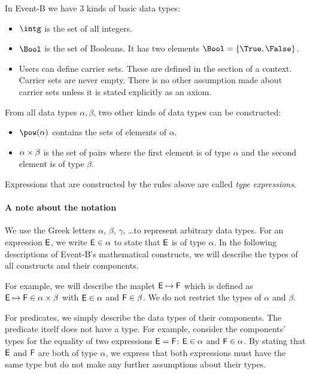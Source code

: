 In Event-B we have 3 kinds of basic data types:
\begin{itemize}
\item {} $\intg$ is the set of all integers.
\item {}
  $\Bool$ is the set of Booleans. 
  It has two elements $\Bool = \{\True,\False\}$.
\item {}
  Users can define carrier sets. 
  These are defined in the  section of a context.
  Carrier sets are never empty.
  There is no other assumption made about carrier sets unless it is stated explicitly as
  an axiom.
\end{itemize}
From all data types $\alpha, \beta$, two other kinds of data types can be constructed:
\begin{itemize}
\item $\pow(\alpha)$ contains the sets of elements of $\alpha$.
\item {} $\alpha\mathbin\times\beta$ is the set of pairs where the first element is of type $\alpha$ and the
  second element is of type $\beta$.
\end{itemize}
 Expressions that are constructed by the rules above are called \emph{type expressions}.

\paragraph{A note about the notation}
We use the Greek letters $\alpha$, $\beta$, $\gamma$, \ldots to represent arbitrary data types.
For an expression $\textsf{E}$, we write $\textsf{E}\in\alpha$ to state that $\textsf{E}$ is of type $\alpha$.
In the following descriptions of Event-B's mathematical constructs, we will describe the
  types of all constructs and their components.

For example, we will describe the maplet $\textsf{E}\mapsto \textsf{F}$ which is defined as $\textsf{E}\mapsto \textsf{F}\in\alpha\mathbin\times\beta$ with
 $\textsf{E}\in\alpha$ and $\textsf{F}\in\beta$. We do not restrict the types of $\alpha$ and $\beta$.

For predicates, we simply describe the data types of their components. 
The predicate itself does not have a type.
For example, consider the components' types for the equality of two expressions $\textsf{E}=\textsf{F}$: $\textsf{E}\in\alpha$ and $\textsf{F}\in\alpha$.
By stating that $\textsf{E}$ and $\textsf{F}$ are both of type $\alpha$, we express that both expressions must have the
  same type but do not make any further assumptions about their types.

